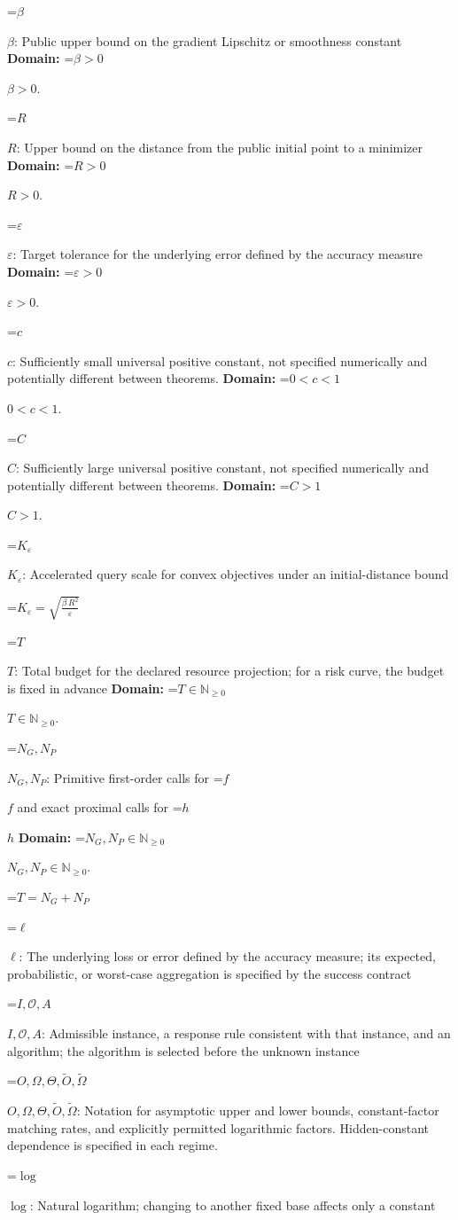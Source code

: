 \documentclass[10pt,a4paper]{article}
\newcommand{\AtlasMath}[1]{\par\begingroup\centering\setbox0=\hbox{$\displaystyle #1$}\ifdim\wd0>1.4\linewidth\typeout{ATLAS WIDE FORMULA: \the\wd0}\fi\ifdim\wd0>\linewidth\resizebox{\linewidth}{!}{\box0}\else\box0\fi\par\endgroup}
\newcommand{\AtlasInlineMath}[1]{\begingroup\setbox0=\hbox{$#1$}\ifdim\wd0>.4\linewidth\endgroup\AtlasMath{#1}\else\endgroup$#1$\fi}
\begin{document}
\AtlasInlineMath{\beta}: Public upper bound on the gradient Lipschitz or smoothness constant \textbf{Domain:} \AtlasInlineMath{\beta>0}.

\AtlasInlineMath{R}: Upper bound on the distance from the public initial point to a minimizer \textbf{Domain:} \AtlasInlineMath{R>0}.

\AtlasInlineMath{\varepsilon}: Target tolerance for the underlying error defined by the accuracy measure \textbf{Domain:} \AtlasInlineMath{\varepsilon>0}.

\AtlasInlineMath{c}: Sufficiently small universal positive constant, not specified numerically and potentially different between theorems. \textbf{Domain:} \AtlasInlineMath{0<c<1}.

\AtlasInlineMath{C}: Sufficiently large universal positive constant, not specified numerically and potentially different between theorems. \textbf{Domain:} \AtlasInlineMath{C>1}.

\AtlasInlineMath{K_\varepsilon}: Accelerated query scale for convex objectives under an initial-distance bound


\AtlasMath{K_\varepsilon=\sqrt{\frac{\beta\,{R}^{2}}{\varepsilon}}}


\AtlasInlineMath{T}: Total budget for the declared resource projection; for a risk curve, the budget is fixed in advance \textbf{Domain:} \AtlasInlineMath{T\in\mathbb{N}_{\ge0}}.

\AtlasInlineMath{N_G,N_P}: Primitive first-order calls for \AtlasInlineMath{f} and exact proximal calls for \AtlasInlineMath{h} \textbf{Domain:} \AtlasInlineMath{N_G,N_P\in\mathbb{N}_{\ge0}}.


\AtlasMath{T=N_G+N_P}


\AtlasInlineMath{\ell}: The underlying loss or error defined by the accuracy measure; its expected, probabilistic, or worst-case aggregation is specified by the success contract

\AtlasInlineMath{I,\mathcal{O},A}: Admissible instance, a response rule consistent with that instance, and an algorithm; the algorithm is selected before the unknown instance

\AtlasInlineMath{O,\Omega,\Theta,\widetilde{O},\widetilde\Omega}: Notation for asymptotic upper and lower bounds, constant-factor matching rates, and explicitly permitted logarithmic factors. Hidden-constant dependence is specified in each regime.

\AtlasInlineMath{\log}: Natural logarithm; changing to another fixed base affects only a constant
\end{document}
